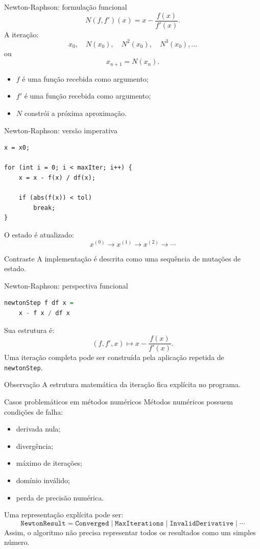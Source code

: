 \documentclass[aspectratio=169,11pt]{beamer}
\begin{document}
\begin{frame}{Newton-Raphson: formulação funcional}
    \[
        N(f,f')(x)=x-\frac{f(x)}{f'(x)}.
    \]
    A iteração:
    \[
        x_0,\quad N(x_0),\quad N^2(x_0),\quad N^3(x_0),\ldots
    \]
    ou
    \[
        x_{n+1}=N(x_n).
    \]
    \begin{itemize}
        \item $f$ é uma função recebida como argumento;
        \item $f'$ é uma função recebida como argumento;
        \item $N$ constrói a próxima aproximação.
    \end{itemize}
\end{frame}

\begin{frame}[fragile]{Newton-Raphson: versão imperativa}
    \begin{lstlisting}
x = x0;

for (int i = 0; i < maxIter; i++) {
    x = x - f(x) / df(x);

    if (abs(f(x)) < tol)
        break;
}
\end{lstlisting}
    O estado é atualizado:
    \[
        x^{(0)}\rightarrow x^{(1)}\rightarrow x^{(2)}
        \rightarrow\cdots
    \]
    \begin{alertblock}{Contraste}
        A implementação é descrita como uma sequência de mutações de estado.
    \end{alertblock}
\end{frame}

\begin{frame}[fragile]{Newton-Raphson: perspectiva funcional}
    \begin{lstlisting}[language=Haskell]
newtonStep f df x =
    x - f x / df x
\end{lstlisting}
    Sua estrutura é:
    \[
        (f,f',x)\longmapsto x-\frac{f(x)}{f'(x)}.
    \]
    Uma iteração completa pode ser construída pela aplicação repetida de
    \texttt{newtonStep}.
    \begin{block}{Observação}
        A estrutura matemática da iteração fica explícita no programa.
    \end{block}
\end{frame}

\begin{frame}{Casos problemáticos em métodos numéricos}
    Métodos numéricos possuem condições de falha:
    \begin{itemize}
        \item derivada nula;
        \item divergência;
        \item máximo de iterações;
        \item domínio inválido;
        \item perda de precisão numérica.
    \end{itemize}
    Uma representação explícita pode ser:
    \[
        \texttt{NewtonResult}=
        \texttt{Converged}\mid
        \texttt{MaxIterations}\mid
        \texttt{InvalidDerivative}\mid\cdots
    \]
    Assim, o algoritmo não precisa representar todos os resultados como um simples
    número.
\end{frame}
\end{document}
